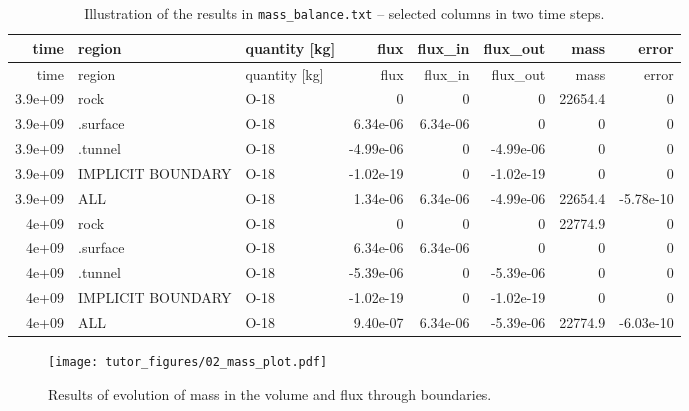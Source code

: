 \begin{longtable}[]{@{}rllrrrrr@{}}
\caption{Illustration of the results in \texttt{mass\_balance.txt} --
selected columns in two time steps.
\label{tbl:mass_balance}}\tabularnewline
\toprule
time & region & quantity {[}kg{]} & flux & flux\_in & flux\_out & mass &
error\tabularnewline
\midrule
\endfirsthead
\toprule
time & region & quantity {[}kg{]} & flux & flux\_in & flux\_out & mass &
error\tabularnewline
\midrule
\endhead
3.9e+09 & rock & O-18 & 0 & 0 & 0 & 22654.4 & 0\tabularnewline
3.9e+09 & .surface & O-18 & 6.34e-06 & 6.34e-06 & 0 & 0 &
0\tabularnewline
3.9e+09 & .tunnel & O-18 & -4.99e-06 & 0 & -4.99e-06 & 0 &
0\tabularnewline
3.9e+09 & IMPLICIT BOUNDARY & O-18 & -1.02e-19 & 0 & -1.02e-19 & 0 &
0\tabularnewline
3.9e+09 & ALL & O-18 & 1.34e-06 & 6.34e-06 & -4.99e-06 & 22654.4 &
-5.78e-10\tabularnewline
4e+09 & rock & O-18 & 0 & 0 & 0 & 22774.9 & 0\tabularnewline
4e+09 & .surface & O-18 & 6.34e-06 & 6.34e-06 & 0 & 0 & 0\tabularnewline
4e+09 & .tunnel & O-18 & -5.39e-06 & 0 & -5.39e-06 & 0 &
0\tabularnewline
4e+09 & IMPLICIT BOUNDARY & O-18 & -1.02e-19 & 0 & -1.02e-19 & 0 &
0\tabularnewline
4e+09 & ALL & O-18 & 9.40e-07 & 6.34e-06 & -5.39e-06 & 22774.9 &
-6.03e-10\tabularnewline
\bottomrule
\end{longtable}

\begin{figure}
\hypertarget{fig:mass_plot}{%
\centering
\texttt{[image: tutor\_figures/02\_mass\_plot.pdf]}
\caption{Results of evolution of mass in the volume and flux through
boundaries.}\label{fig:mass_plot}
}
\end{figure}
